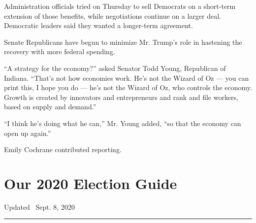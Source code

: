 Administration officials tried on Thursday to sell Democrats on a
short-term extension of those benefits, while negotiations continue on a
larger deal. Democratic leaders said they wanted a longer-term
agreement.

Senate Republicans have begun to minimize Mr. Trump's role in hastening
the recovery with more federal spending.

``A strategy for the economy?'' asked Senator Todd Young, Republican of
Indiana. ``That's not how economies work. He's not the Wizard of Oz ---
you can print this, I hope you do --- he's not the Wizard of Oz, who
controls the economy. Growth is created by innovators and entrepreneurs
and rank and file workers, based on supply and demand.''

``I think he's doing what he can,'' Mr. Young added, ``so that the
economy can open up again.''

Emily Cochrane contributed reporting.

\hypertarget{our-2020-election-guide}{%
\section{Our 2020 Election Guide}\label{our-2020-election-guide}}

Updated ~Sept. 8, 2020

\begin{center}\rule{0.5\linewidth}{\linethickness}\end{center}

